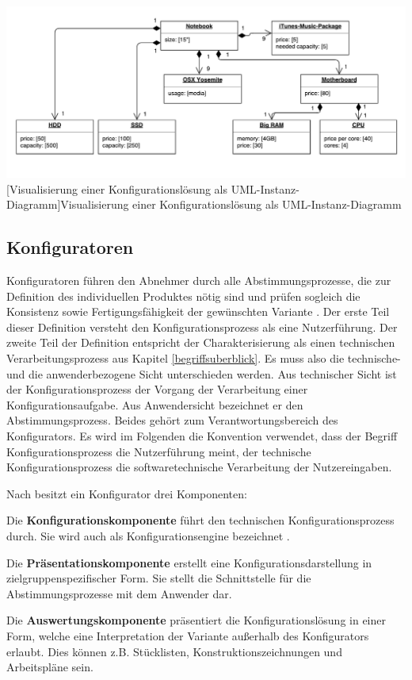 \documentclass[11pt, a4paper, titlepage, listof=totoc, bibliography=totoc, index=totoc, twoside, openright, headings=normal]{scrreprt}
\begin{document}
\vspace{1em}
\begin{minipage}{\linewidth}
	\centering
	\includegraphics[width=1\linewidth]{Abbildungen/notebookInstanceUML.pdf}
	[Visualisierung einer Konfigurationslösung als UML-Instanz-Diagramm]{Visualisierung einer Konfigurationslösung als UML-Instanz-Diagramm}
	\label{fig:notebookInstanceUML}
\end{minipage}
\vspace{1em}

\subsection{Konfiguratoren}
\label{Konfigurationssysteme}
Konfiguratoren \glqq [...] führen den Abnehmer durch alle Abstimmungsprozesse, die zur Definition des individuellen Produktes nötig sind und prüfen sogleich die Konsistenz sowie Fertigungsfähigkeit der gewünschten Variante\grqq{} \citep{piller06}. Der erste Teil dieser Definition versteht den Konfigurationsprozess als eine Nutzerführung. Der zweite Teil der Definition entspricht der Charakterisierung als einen technischen Verarbeitungsprozess aus Kapitel \ref{begriffsuberblick}. Es muss also die technische- und die anwenderbezogene Sicht unterschieden werden. Aus technischer Sicht ist der Konfigurationsprozess der Vorgang der Verarbeitung einer Konfigurationsaufgabe. Aus Anwendersicht bezeichnet er den Abstimmungsprozess. Beides gehört zum Verantwortungsbereich des Konfigurators. Es wird im Folgenden die Konvention verwendet, dass der Begriff \glqq Konfigurationsprozess\grqq{} die Nutzerführung meint, der \glqq technische Konfigurationsprozess\grqq{} die softwaretechnische Verarbeitung der Nutzereingaben.

Nach \citet{piller06} besitzt ein Konfigurator drei Komponenten:
\begin{compactitem}
\item Die \textbf{Konfigurationskomponente} führt den technischen Konfigurationsprozess durch. Sie wird auch als Konfigurationsengine bezeichnet \citep{tactonProductOverview}.
\item Die \textbf{Präsentationskomponente} erstellt eine Konfigurationsdarstellung in zielgruppenspezifischer Form. Sie stellt die Schnittstelle für die Abstimmungsprozesse mit dem Anwender dar.
\item Die \textbf{Auswertungskomponente} präsentiert die Konfigurationslösung in einer Form, welche eine Interpretation der Variante außerhalb des Konfigurators erlaubt. Dies können z.B. Stücklisten, Konstruktionszeichnungen und Arbeitspläne sein.
\end{compactitem}
\end{document}

